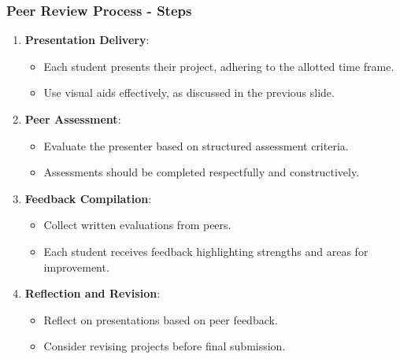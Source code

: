\documentclass{beamer}
\begin{document}
\begin{frame}[fragile]
    \frametitle{Peer Review Process - Steps}
    \begin{enumerate}
        \item \textbf{Presentation Delivery}:
        \begin{itemize}
            \item Each student presents their project, adhering to the allotted time frame.
            \item Use visual aids effectively, as discussed in the previous slide.
        \end{itemize}
        
        \item \textbf{Peer Assessment}:
        \begin{itemize}
            \item Evaluate the presenter based on structured assessment criteria.
            \item Assessments should be completed respectfully and constructively.
        \end{itemize}
        
        \item \textbf{Feedback Compilation}:
        \begin{itemize}
            \item Collect written evaluations from peers.
            \item Each student receives feedback highlighting strengths and areas for improvement.
        \end{itemize}
        
        \item \textbf{Reflection and Revision}:
        \begin{itemize}
            \item Reflect on presentations based on peer feedback.
            \item Consider revising projects before final submission.
        \end{itemize}
    \end{enumerate}
\end{frame}
\end{document}
